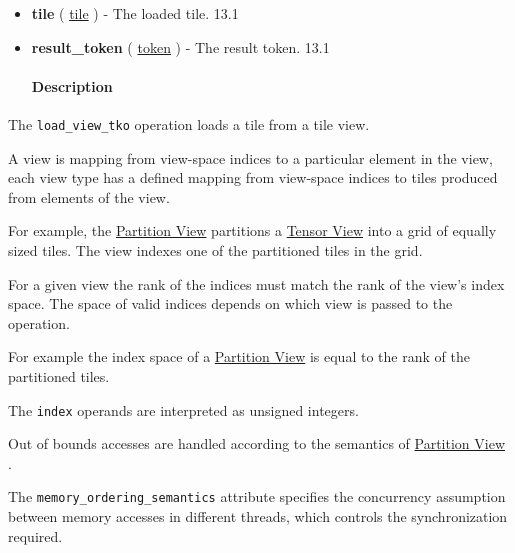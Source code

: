 \documentclass{article}
\begin{document}
\begin{itemize}
\paragraph{Results}

\item \textbf{tile} ( \href{https://docs.nvidia.com/cuda/tile-ir/latest/sections/types.html#type-tile}{tile} ) - The loaded tile. 13.1
\item \textbf{result\_token} ( \href{https://docs.nvidia.com/cuda/tile-ir/latest/sections/operations.html#type-token}{token} ) - The result token. 13.1


\paragraph{Description}

\end{itemize}
The \texttt{load\_view\_tko} operation loads a tile from a tile view.


A view is mapping from view-space indices to a particular element in the view, each view type has a defined mapping from view-space indices to tiles produced from elements of the view.


For example, the \href{https://docs.nvidia.com/cuda/tile-ir/latest/sections/types.html#type-partition-view}{Partition View} partitions a \href{https://docs.nvidia.com/cuda/tile-ir/latest/sections/types.html#type-tensor-view}{Tensor View} into a grid of equally sized tiles. The view indexes one of the partitioned tiles in the grid.


For a given view the rank of the indices must match the rank of the view's index space. The space of valid indices depends on which view is passed to the operation.

For example the index space of a \href{https://docs.nvidia.com/cuda/tile-ir/latest/sections/types.html#type-partition-view}{Partition View} is equal to the rank of the partitioned tiles.


The \texttt{index} operands are interpreted as unsigned integers.


Out of bounds accesses are handled according to the semantics of \href{https://docs.nvidia.com/cuda/tile-ir/latest/sections/types.html#type-partition-view}{Partition View} .


The \texttt{memory\_ordering\_semantics} attribute specifies the concurrency assumption between memory accesses in different threads, which controls the synchronization required.
\end{document}
